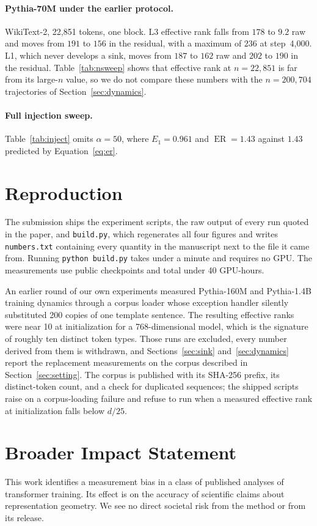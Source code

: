 \documentclass{article}
\theoremstyle{spaced}
\theoremstyle{definition}
\DeclareMathOperator{\ER}{ER}
\begin{document}
\paragraph{Pythia-70M under the earlier protocol.} WikiText-2, 22{,}851 tokens, one block. L3 effective rank falls from $178$ to $9.2$ raw and moves from $191$ to $156$ in the residual, with a maximum of $236$ at step~4{,}000. L1, which never develops a sink, moves from $187$ to $162$ raw and $202$ to $190$ in the residual. Table~\ref{tab:nsweep} shows that effective rank at $n = 22{,}851$ is far from its large-$n$ value, so we do not compare these numbers with the $n = 200{,}704$ trajectories of Section~\ref{sec:dynamics}.

\paragraph{Full injection sweep.} Table~\ref{tab:inject} omits $\alpha = 50$, where $E_1 = 0.961$ and $\ER = 1.43$ against $1.43$ predicted by Equation~\ref{eq:er}.

\section{Reproduction}
\label{app:repro}

The submission ships the experiment scripts, the raw output of every run quoted in the paper, and \texttt{build.py}, which regenerates all four figures and writes \texttt{numbers.txt} containing every quantity in the manuscript next to the file it came from. Running \texttt{python build.py} takes under a minute and requires no GPU. The measurements use public checkpoints and total under 40 GPU-hours.

An earlier round of our own experiments measured Pythia-160M and Pythia-1.4B training dynamics through a corpus loader whose exception handler silently substituted 200 copies of one template sentence. The resulting effective ranks were near 10 at initialization for a 768-dimensional model, which is the signature of roughly ten distinct token types. Those runs are excluded, every number derived from them is withdrawn, and Sections~\ref{sec:sink} and~\ref{sec:dynamics} report the replacement measurements on the corpus described in Section~\ref{sec:setting}. The corpus is published with its SHA-256 prefix, its distinct-token count, and a check for duplicated sequences; the shipped scripts raise on a corpus-loading failure and refuse to run when a measured effective rank at initialization falls below $d/25$.

\section*{Broader Impact Statement}

This work identifies a measurement bias in a class of published analyses of transformer training. Its effect is on the accuracy of scientific claims about representation geometry. We see no direct societal risk from the method or from its release.
\end{document}
